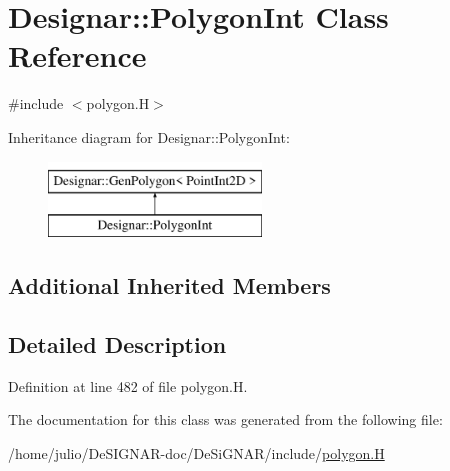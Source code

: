 \hypertarget{class_designar_1_1_polygon_int}{}\section{Designar\+:\+:Polygon\+Int Class Reference}
\label{class_designar_1_1_polygon_int}


{\ttfamily \#include $<$polygon.\+H$>$}

Inheritance diagram for Designar\+:\+:Polygon\+Int\+:\begin{figure}[H]
\begin{center}
\leavevmode
\includegraphics[height=2.000000cm]{class_designar_1_1_polygon_int}
\end{center}
\end{figure}
\subsection*{Additional Inherited Members}


\subsection{Detailed Description}


Definition at line 482 of file polygon.\+H.



The documentation for this class was generated from the following file\+:\begin{DoxyCompactItemize}
\item 
/home/julio/\+De\+S\+I\+G\+N\+A\+R-\/doc/\+De\+Si\+G\+N\+A\+R/include/\hyperlink{polygon_8_h}{polygon.\+H}\end{DoxyCompactItemize}
